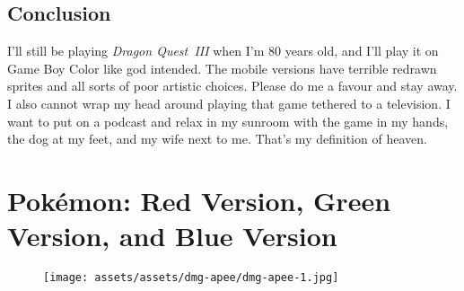 \documentclass{book}
\begin{document}
\FloatBarrier\needspace{10mm}\section*{Conclusion}\nopagebreak[4]

I’ll still be playing \emph{Dragon Quest III} when I’m 80 years old, and I’ll play it on Game Boy Color like god intended. The mobile versions have terrible redrawn sprites and all sorts of poor artistic choices. Please do me a favour and stay away. I also cannot wrap my head around playing that game tethered to a television. I want to put on a podcast and relax in my sunroom with the game in my hands, the dog at my feet, and my wife next to me. That’s my definition of heaven.



\begingroup \chapter*{Pokémon: Red Version, Green Version, and Blue Version} \endgroup
\begin{figure}[H]
\vskip 4pt
\centering
\texttt{[image: assets/assets/dmg-apee/dmg-apee-1.jpg]}\end{figure}
\end{document}
